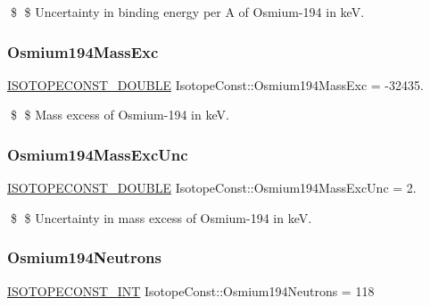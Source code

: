 \$ \$ Uncertainty in binding energy per A of Osmium-\/194 in keV. \mbox{\label{group___isotope_const-_osmium-_os194_ga4675e9243df0b50a59d068d9d8ebce35}} 
\subsubsection{\texorpdfstring{Osmium194\+Mass\+Exc}{Osmium194MassExc}}
{\footnotesize\ttfamily \mbox{\hyperlink{group___isotope_const-_macros_ga8f45a7272ce02c0b4c65c44636ed719a}{I\+S\+O\+T\+O\+P\+E\+C\+O\+N\+S\+T\+\_\+\+D\+O\+U\+B\+LE}} Isotope\+Const\+::\+Osmium194\+Mass\+Exc = -\/32435.}

\$ \$ Mass excess of Osmium-\/194 in keV. \mbox{\label{group___isotope_const-_osmium-_os194_ga2c65b91a0e10a3318bb93e3c0d04ef00}} 
\subsubsection{\texorpdfstring{Osmium194\+Mass\+Exc\+Unc}{Osmium194MassExcUnc}}
{\footnotesize\ttfamily \mbox{\hyperlink{group___isotope_const-_macros_ga8f45a7272ce02c0b4c65c44636ed719a}{I\+S\+O\+T\+O\+P\+E\+C\+O\+N\+S\+T\+\_\+\+D\+O\+U\+B\+LE}} Isotope\+Const\+::\+Osmium194\+Mass\+Exc\+Unc = 2.}

\$ \$ Uncertainty in mass excess of Osmium-\/194 in keV. \mbox{\label{group___isotope_const-_osmium-_os194_ga57384d75a717e64e3b362c2e02a4bcb6}} 
\subsubsection{\texorpdfstring{Osmium194\+Neutrons}{Osmium194Neutrons}}
{\footnotesize\ttfamily \mbox{\hyperlink{group___isotope_const-_macros_ga5f18360b3e99483a35c32d789e62621c}{I\+S\+O\+T\+O\+P\+E\+C\+O\+N\+S\+T\+\_\+\+I\+NT}} Isotope\+Const\+::\+Osmium194\+Neutrons = 118}

